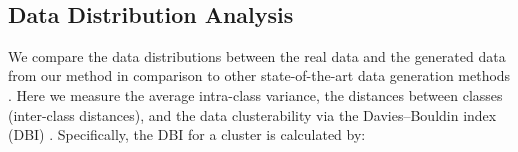 \documentclass[10pt,twocolumn,letterpaper]{article}
\begin{document}
\begin{table}[!h] 
    \centering
   \\ \caption{Few-shot classification accuracy on the CUB ~\cite{cub} and NAB \cite{nab} dataset in 1-shot and 5-shot setting with different methods to model intra-class variance.
}
    \label{tab:distribution_comparison}\end{table}


\begin{comment}
  \begin{figure}[h]
\centering
\begin{subfigure}{.25\textwidth}
  \centering
  \texttt{[image: latex/figs/features\_all.pdf]}
  \caption{}
  \label{fig:feats_base}
\end{subfigure}\begin{subfigure}{.25\textwidth}
  \centering
  \texttt{[image: latex/figs/features\_all\_novel.pdf]}
  \caption{}
  \label{fig:feats_novel}
\end{subfigure}
\caption{}
\label{fig:feats_tsne}
\end{figure}
\end{comment}

\subsection{Data Distribution Analysis}

We  compare the data distributions between the real data and the generated data from our method in comparison to other state-of-the-art data generation methods \cite{feature_transfer,delta-encoder}.  Here we measure the average intra-class variance, the distances between classes (inter-class distances), and the data clusterability via the Davies–Bouldin index (DBI) \cite{dbindex}.  
Specifically, the DBI for a cluster  is calculated by:
\end{document}
